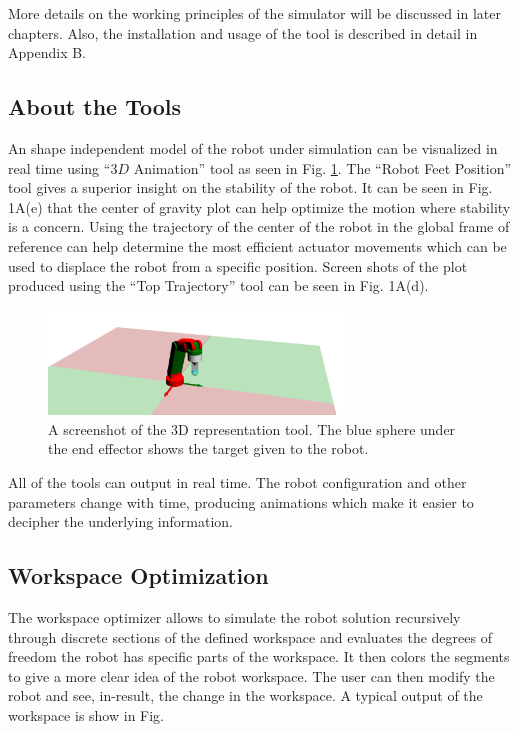 {    More details on the working principles of the simulator will be discussed in later chapters. Also, the installation and usage of the tool is described in detail in Appendix B.

    \subsection{About the Tools}

    An shape independent model of the robot under simulation can be visualized in real time using ``$3D$ Animation'' tool as seen in Fig. \ref{Fig3D}. The ``Robot Feet Position'' tool gives a superior insight on the stability of the robot. It can be seen in Fig. 1A(e) that the center of gravity plot can help optimize the motion where stability is a concern. Using the trajectory of the center of the robot in the global frame of reference can help determine the most efficient actuator movements which can be used to displace the robot from a specific position. Screen shots of the plot produced using the ``Top Trajectory'' tool can be seen in Fig. 1A(d).


        \begin{figure}
          \centering
          \includegraphics[width=0.7\textwidth]{3D.png}
          \caption{A screenshot of the $3$D representation tool. The blue sphere under the end effector shows the target given to the robot.
          } \label{Fig3D}
        \end{figure}

    All of the tools can output in real time. The robot configuration and other parameters change with time, producing animations which make it easier to decipher the underlying information.

    \subsection{Workspace Optimization}
    The workspace optimizer allows to simulate the robot solution recursively through discrete sections of the defined workspace and evaluates the degrees of freedom the robot has  specific parts of the workspace. It then colors the segments to give a more clear idea of the robot workspace. The user can then modify the robot and see, in-result, the change in the workspace. A typical output of the workspace is show in Fig.

}
